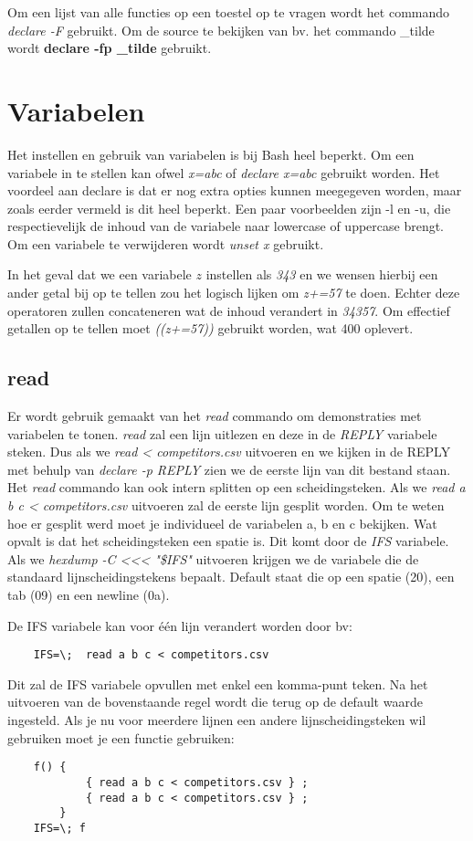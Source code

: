 \documentclass{report}
\begin{document}
Om een lijst van alle functies op een toestel op te vragen wordt het commando \textit{declare -F} gebruikt. Om de source te bekijken van bv. het commando \_tilde wordt \textbf{declare -fp \_tilde} gebruikt.

\section{Variabelen}
Het instellen en gebruik van variabelen is bij Bash heel beperkt. Om een variabele in te stellen kan ofwel \textit{x=abc} of \textit{declare x=abc} gebruikt worden. Het voordeel aan declare is dat er nog extra opties kunnen meegegeven worden, maar zoals eerder vermeld is dit heel beperkt. Een paar voorbeelden zijn -l en -u, die respectievelijk de inhoud van de variabele naar lowercase of uppercase brengt. Om een variabele te verwijderen wordt \textit{unset x} gebruikt.

In het geval dat we een variabele $z$ instellen als \textit{343} en we wensen hierbij een ander getal bij op te tellen zou het logisch lijken om \textit{z+=57} te doen. Echter deze operatoren zullen concateneren wat de inhoud verandert in \textit{34357}. Om effectief getallen op te tellen moet \textit{((z+=57))} gebruikt worden, wat 400 oplevert.

\subsection{read}
Er wordt gebruik gemaakt van het \textit{read} commando om demonstraties met variabelen te tonen. \textit{read} zal een lijn uitlezen en deze in de \textit{REPLY} variabele steken. Dus als we \textit{read < competitors.csv} uitvoeren en we kijken in de REPLY met behulp van \textit{declare -p REPLY} zien we de eerste lijn van dit bestand staan. Het \textit{read} commando kan ook intern splitten op een scheidingsteken. Als we \textit{read a b c < competitors.csv} uitvoeren zal de eerste lijn gesplit worden. Om te weten hoe er gesplit werd moet je individueel de variabelen a, b en c bekijken. Wat opvalt is dat het scheidingsteken een spatie is. Dit komt door de \textit{IFS} variabele. Als we \textit{hexdump -C <<< "\$IFS"} uitvoeren krijgen we de variabele die de standaard lijnscheidingstekens bepaalt. Default staat die op een spatie (20), een tab (09) en een newline (0a).

De IFS variabele kan voor één lijn verandert worden door bv:
\begin{lstlisting}
	IFS=\;	read a b c < competitors.csv
\end{lstlisting}
Dit zal de IFS variabele opvullen met enkel een komma-punt teken. Na het uitvoeren van de bovenstaande regel wordt die terug op de default waarde ingesteld. Als je nu voor meerdere lijnen een andere lijnscheidingsteken wil gebruiken moet je een functie gebruiken:
\begin{lstlisting}
	f() {
			{ read a b c < competitors.csv } ; 
			{ read a b c < competitors.csv } ;
		}
	IFS=\; f
\end{lstlisting}
\end{document}
